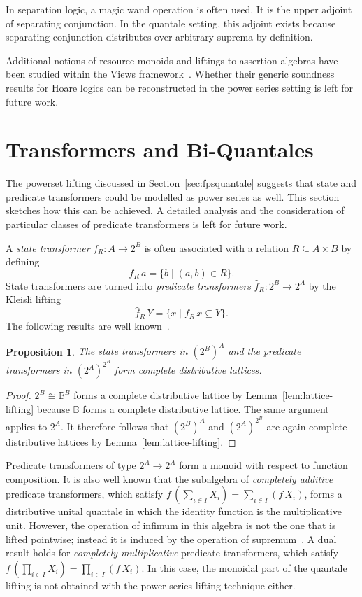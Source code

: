 \documentclass[12pt]{article}
\newtheorem{proposition}{Proposition}
\theoremstyle{definition}
\begin{document}
In separation logic, a magic wand operation is often used. It is the
upper adjoint of separating conjunction. In the quantale setting, this
adjoint exists because separating conjunction distributes over
arbitrary suprema by definition.

Additional notions of resource monoids and liftings to assertion
algebras have been studied within the Views
framework~\cite{D-YBGPY13}. Whether their generic soundness results for
Hoare logics can be reconstructed in the power series setting is left
for future work.



\section{Transformers and Bi-Quantales}\label{sec:transformers}

The powerset lifting discussed in Section~\ref{sec:fpsquantale}
suggests that state and predicate transformers could be modelled as
power series as well.  This section sketches how this can be
achieved. A detailed analysis and the consideration of particular
classes of predicate transformers is left for future work.

A \emph{state transformer} $f_R:A\to 2^B$ is often associated with a
relation $R\subseteq A\times B$ by defining
\begin{equation*}
  f_R\, a=\{b \mid (a,b)\in R\}.
\end{equation*}
State transformers are turned into \emph{predicate transformers}
$\hat{f}_R:2^B\to 2^A$ by the Kleisli lifting
\begin{equation*}
  \hat{f}_R\, Y=\{x \mid f_R\, x\subseteq Y\}. 
\end{equation*}
The following results are well known~\cite{BvW99-book}.
\begin{proposition}
The  state transformers in $(2^B)^A$ and the predicate transformers in
$(2^A)^{2^B}$ form complete distributive lattices.
\end{proposition}
\begin{proof} $2^B\cong\mathbb{B}^B$ forms a complete distributive
  lattice by Lemma~\ref{lem:lattice-lifting} because $\mathbb{B}$
  forms a complete distributive lattice. The same argument applies to
  $2^A$. It therefore follows that $(2^B)^A$ and $(2^A)^{2^B}$ are again
  complete distributive lattices by
  Lemma~\ref{lem:lattice-lifting}.
\end{proof}
Predicate transformers of type $2^A\to 2^A$ form a monoid with respect
to function composition. It is also well known that the subalgebra of
\emph{completely additive} predicate transformers, which satisfy $f\,
(\sum_{i\in I}X_i)= \sum_{i\in I} (f\, X_i)$, forms a distributive
unital quantale in which the identity function is the multiplicative
unit. However, the operation of infimum in this algebra is not the one
that is lifted pointwise; instead it is induced by the operation of
supremum~\cite{BvW99-book}. A dual result holds for \emph{completely
  multiplicative} predicate transformers, which satisfy $f\,
(\prod_{i\in I}X_i)= \prod_{i\in I} (f\, X_i)$. In this case, the
monoidal part of the quantale lifting is not obtained with the power
series lifting technique either.
\end{document}
